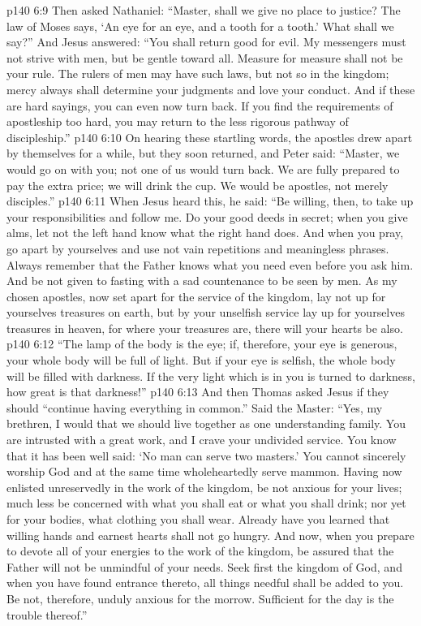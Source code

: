 \vs p140 6:9 Then asked Nathaniel: “Master, shall we give no place to justice? The law of Moses says, ‘An eye for an eye, and a tooth for a tooth.’ What shall we say?” And Jesus answered: \textcolor{ubdarkred}{“You shall return good for evil. My messengers must not strive with men, but be gentle toward all. Measure for measure shall not be your rule. The rulers of men may have such laws, but not so in the kingdom; mercy always shall determine your judgments and love your conduct. And if these are hard sayings, you can even now turn back. If you find the requirements of apostleship too hard, you may return to the less rigorous pathway of discipleship.”}
\vs p140 6:10 On hearing these startling words, the apostles drew apart by themselves for a while, but they soon returned, and Peter said: “Master, we would go on with you; not one of us would turn back. We are fully prepared to pay the extra price; we will drink the cup. We would be apostles, not merely disciples.”\plusone
\vs p140 6:11 When Jesus heard this, he said: \textcolor{ubdarkred}{“Be willing, then, to take up your responsibilities and follow me. Do your good deeds in secret; when you give alms, let not the left hand know what the right hand does. And when you pray, go apart by yourselves and use not vain repetitions and meaningless phrases. Always remember that the Father knows what you need even before you ask him. And be not given to fasting with a sad countenance to be seen by men. As my chosen apostles, now set apart for the service of the kingdom, lay not up for yourselves treasures on earth, but by your unselfish service lay up for yourselves treasures in heaven, for where your treasures are, there will your hearts be also.}
\vs p140 6:12 \textcolor{ubdarkred}{“The lamp of the body is the eye; if, therefore, your eye is generous, your whole body will be full of light. But if your eye is selfish, the whole body will be filled with darkness. If the very light which is in you is turned to darkness, how great is that darkness!”}\plusone
\vs p140 6:13 And then Thomas asked Jesus if they should “continue having everything in common.” Said the Master: \textcolor{ubdarkred}{“Yes, my brethren, I would that we should live together as one understanding family. You are intrusted with a great work, and I crave your undivided service. You know that it has been well said: ‘No man can serve two masters.’ You cannot sincerely worship God and at the same time wholeheartedly serve mammon. Having now enlisted unreservedly in the work of the kingdom, be not anxious for your lives; much less be concerned with what you shall eat or what you shall drink; nor yet for your bodies, what clothing you shall wear. Already have you learned that willing hands and earnest hearts shall not go hungry. And now, when you prepare to devote all of your energies to the work of the kingdom, be assured that the Father will not be unmindful of your needs. Seek first the kingdom of God, and when you have found entrance thereto, all things needful shall be added to you. Be not, therefore, unduly anxious for the morrow. Sufficient for the day is the trouble thereof.”}
